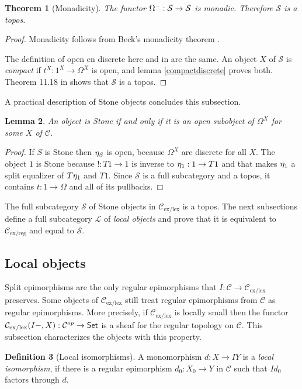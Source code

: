 \documentclass[sort&compress]{elsarticle}
\theoremstyle{plain}
\newtheorem{theorem}{Theorem}
\newtheorem{lemma}[theorem]{Lemma}
\theoremstyle{definition}
\newtheorem{defin}[theorem]{Definition}
\theoremstyle{remark}
\newcommand\cat\mathcal
\newcommand\exlex{_\mathrm{ex/lex}}\newcommand\exreg{_\mathrm{ex/reg}}
\begin{document}
\begin{theorem}[Monadicity] The functor $\clopow-:\cat S\to\cat S$ is monadic. Therefore $\cat S$ is a topos. \end{theorem}

\begin{proof} Monadicity follows from Beck's monadicity theorem \citep[VI.7]{MR0354798}.

The definition of open en discrete here and in \citet{MR1799865} are the same. An object $X$ of $\cat S$ is \emph{compact} if $t^X:1^X\to \Omega^X$ is open, and lemma \ref{compactdiscrete} proves both. Theorem 11.18 in \citet{MR1799865} shows that $\cat S$ is a topos.\end{proof}

A practical description of Stone objects concludes this subsection.

\begin{lemma} An object is Stone if and only if it is an open subobject of $\Omega^X$ for some $X$ of $\cat C$. \label{Stoneequiv} \end{lemma}

\begin{proof} If $S$ is Stone then $\eta_ S$ is open, because $\Omega^X$ are discrete for all $X$.
The object $1$ is Stone because $!:T1 \to 1$ is inverse to $\eta_ 1: 1\to T1$ and that makes $\eta_ 1$ a split equalizer of $T\eta_ 1$ and $\unit{T1}$.
Since $\cat S$ is a full subcategory and a topos, it contains $t:1\to \Omega$ and all of its pullbacks.
\end{proof}

The full subcategory $\cat S$ of Stone objects in $\cat C\exlex$ is a topos. The next subsections define a full subcategory $\cat L$ of \emph{local objects} and prove that it is equivalent to $\cat C\exreg$ and equal to $\cat S$.

\subsection{Local objects}
Split epimorphisms are the only regular epimorphisms that $I:\cat C \to\cat C\exlex$ preserves. Some objects of $\cat C\exlex$ still treat regular epimorphisms from $\cat C$ as regular epimorphisms. More precisely, if $\cat C\exlex$ is locally small then the functor $\cat C\exlex(I-,X):\cat C\dual \to \Set$ is a sheaf for the regular topology on $\cat C$. This subsection characterizes the objects with this property.

\begin{defin}[Local isomorphisms] A monomorphism $d:X\to IY$ is a \emph{local isomorphism}, if there is a regular epimorphism $d_0:X_0 \to Y$ in $\cat C$ such that $Id_0$ factors through $d$.
\end{defin}
\end{document}
